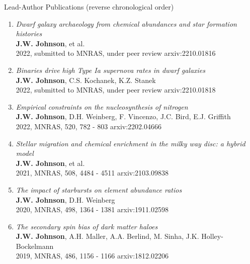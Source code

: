 \documentclass[cv.tex]{subfiles}
\begin{document}


\vspace{-3mm}
\noindent
{\color{themecolor} \large Lead-Author Publications}
(reverse chronological order)
\par\noindent
\begin{enumerate}

	\vspace{-3mm}

	\item \textit{Dwarf galaxy archaeology from chemical abundances and star
	formation histories}
	\\
	\textbf{J.W. Johnson}, et al.
	\\
	2022, submitted to MNRAS, under peer review \hfill arxiv:2210.01816

	\item \textit{Binaries drive high Type Ia supernova rates in dwarf
	galaxies}
	\\
	\textbf{J.W. Johnson}, C.S. Kochanek, K.Z. Stanek
	\\
	2022, submitted to MNRAS, under peer review \hfill arxiv:2210.01818

	\item \textit{Empirical constraints on the nucleosynthesis of nitrogen}
	\\
	\textbf{J.W. Johnson}, D.H. Weinberg, F. Vincenzo, J.C. Bird, E.J. Griffith
	\\
	2022, MNRAS, 520, 782 - 803 \hfill arxiv:2202.04666

	\item \textit{Stellar migration and chemical enrichment in the milky way
	disc: a hybrid model}
	\\
	\textbf{J.W. Johnson}, et al.
	\\
	2021, MNRAS, 508, 4484 - 4511 \hfill arxiv:2103.09838

	\item \textit{The impact of starbursts on element abundance ratios}
	\\
	\textbf{J.W. Johnson}, D.H. Weinberg
	\\
	2020, MNRAS, 498, 1364 - 1381 \hfill arxiv:1911.02598

	\item \textit{The secondary spin bias of dark matter haloes}
	\\
	\textbf{J.W. Johnson}, A.H. Maller, A.A. Berlind, M. Sinha,
	J.K. Holley-Bockelmann
	\\
	2019, MNRAS, 486, 1156 - 1166 \hfill arxiv:1812.02206

\end{enumerate}
\end{document}
